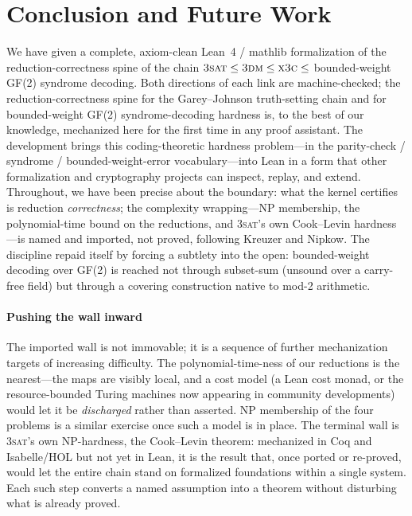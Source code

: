 \documentclass[sigplan,review,anonymous]{acmart}
\begin{document}
\section{Conclusion and Future Work}\label{sec:concl}

We have given a complete, axiom-clean Lean~4 / mathlib formalization of the reduction-correctness spine of the
chain $\textsc{3sat} \le \textsc{3dm} \le \textsc{x3c} \le$ bounded-weight GF(2) syndrome decoding. Both
directions of each link are machine-checked; the reduction-correctness spine for the Garey--Johnson
truth-setting chain and for bounded-weight GF(2) syndrome-decoding hardness is, to the best of our knowledge,
mechanized here for the first time in any proof assistant. The development brings this coding-theoretic hardness
problem---in the parity-check / syndrome / bounded-weight-error vocabulary---into Lean in a form that other
formalization and cryptography projects can inspect, replay, and extend. Throughout, we have been precise about
the boundary: what the kernel certifies is reduction \emph{correctness}; the complexity wrapping---NP
membership, the polynomial-time bound on the reductions, and \textsc{3sat}'s own Cook--Levin hardness---is named
and imported, not proved, following Kreuzer and Nipkow. The discipline repaid itself by forcing a subtlety into
the open: bounded-weight decoding over GF(2) is reached not through subset-sum (unsound over a carry-free field)
but through a covering construction native to mod-2 arithmetic.

\paragraph{Pushing the wall inward} The imported wall is not immovable; it is a sequence of further
mechanization targets of increasing difficulty. The polynomial-time-ness of our reductions is the nearest---the
maps are visibly local, and a cost model (a Lean cost monad, or the resource-bounded Turing machines now
appearing in community developments) would let it be \emph{discharged} rather than asserted. NP membership of
the four problems is a similar exercise once such a model is in place. The terminal wall is \textsc{3sat}'s own
NP-hardness, the Cook--Levin theorem: mechanized in Coq and Isabelle/HOL but not yet in Lean, it is the result
that, once ported or re-proved, would let the entire chain stand on formalized foundations within a single
system. Each such step converts a named assumption into a theorem without disturbing what is already proved.
\end{document}
